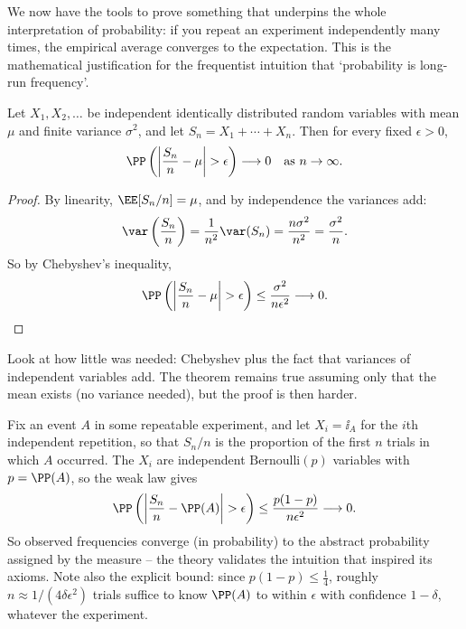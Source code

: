 We now have the tools to prove something that underpins the whole interpretation of probability: if you repeat an experiment independently many times, the empirical average converges to the expectation. This is the mathematical justification for the frequentist intuition that `probability is long-run frequency'.

\begin{theorem}
	Let $X_1, X_2, \dots$ be independent identically distributed random variables with mean $\mu$ and finite variance $\sigma^2$, and let $S_n = X_1 + \cdots + X_n$. Then for every fixed $\epsilon > 0$,
	$$
	\PP\left(\left|\frac{S_n}{n} - \mu\right| > \epsilon \right) \longrightarrow 0 \quad \text{as } n \rightarrow \infty.
	$$
\end{theorem}
\begin{proof}
	By linearity, $\EE[S_n / n] = \mu$, and by independence the variances add:
	$$
	\var\left(\frac{S_n}{n}\right) = \frac{1}{n^2}\var(S_n) = \frac{n\sigma^2}{n^2} = \frac{\sigma^2}{n}.
	$$
	So by Chebyshev's inequality,
	$$
	\PP\left(\left|\frac{S_n}{n} - \mu\right| > \epsilon\right) \leq \frac{\sigma^2}{n\epsilon^2} \longrightarrow 0. \qedhere
	$$
\end{proof}

Look at how little was needed: Chebyshev plus the fact that variances of independent variables add. The theorem remains true assuming only that the mean exists (no variance needed), but the proof is then harder.

\begin{example}
	Fix an event $A$ in some repeatable experiment, and let $X_i = \ii_{A}$ for the $i$th independent repetition, so that $S_n / n$ is the proportion of the first $n$ trials in which $A$ occurred. The $X_i$ are independent $\mathrm{Bernoulli}(p)$ variables with $p = \PP(A)$, so the weak law gives
	$$
	\PP\left(\left|\frac{S_n}{n} - \PP(A)\right| > \epsilon\right) \leq \frac{p(1-p)}{n\epsilon^2} \longrightarrow 0.
	$$
	So observed frequencies converge (in probability) to the abstract probability assigned by the measure -- the theory validates the intuition that inspired its axioms. Note also the explicit bound: since $p(1-p) \leq \frac14$, roughly $n \approx 1/(4\delta\epsilon^2)$ trials suffice to know $\PP(A)$ to within $\epsilon$ with confidence $1 - \delta$, whatever the experiment.
\end{example}

